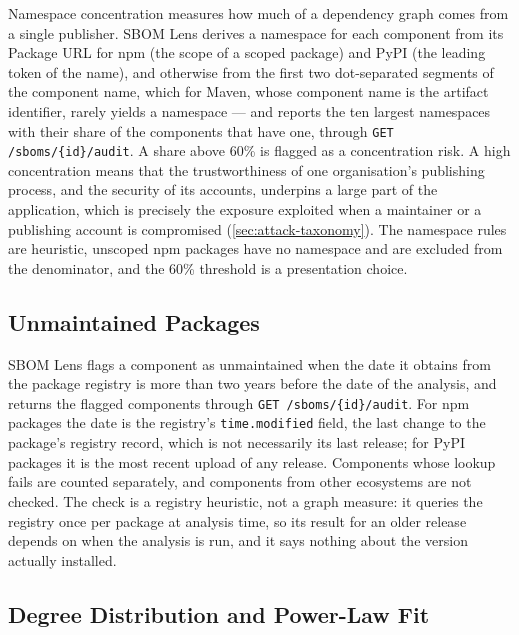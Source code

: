 Namespace concentration measures how much of a dependency graph comes from a single publisher. SBOM Lens derives a namespace for each component from its Package URL for npm (the scope of a scoped package) and PyPI (the leading token of the name), and otherwise from the first two dot-separated segments of the component name, which for Maven, whose component name is the artifact identifier, rarely yields a namespace --- and reports the ten largest namespaces with their share of the components that have one, through \texttt{GET /sboms/\{id\}/audit}. A share above 60\% is flagged as a concentration risk. A high concentration means that the trustworthiness of one organisation's publishing process, and the security of its accounts, underpins a large part of the application, which is precisely the exposure exploited when a maintainer or a publishing account is compromised (\autoref{sec:attack-taxonomy}). The namespace rules are heuristic, unscoped npm packages have no namespace and are excluded from the denominator, and the 60\% threshold is a presentation choice.


\subsection{Unmaintained Packages}
\label{sec:ns-unmaintained}

SBOM Lens flags a component as unmaintained when the date it obtains from the package registry is more than two years before the date of the analysis, and returns the flagged components through \texttt{GET /sboms/\{id\}/audit}. For npm packages the date is the registry's \texttt{time.modified} field, the last change to the package's registry record, which is not necessarily its last release; for PyPI packages it is the most recent upload of any release. Components whose lookup fails are counted separately, and components from other ecosystems are not checked. The check is a registry heuristic, not a graph measure: it queries the registry once per package at analysis time, so its result for an older release depends on when the analysis is run, and it says nothing about the version actually installed.


\subsection{Degree Distribution and Power-Law Fit}
\label{sec:ns-powerlaw}

